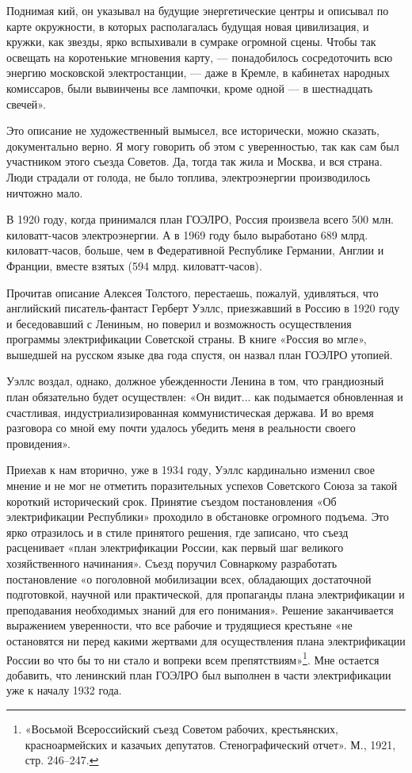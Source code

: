 \documentclass[12pt, a4paper, openany]{book}
\begin{document}
Поднимая кий, он указывал на будущие энергетические центры и описывал по карте окружности, в которых располагалась будущая новая цивилизация, и кружки, как звезды, ярко вспыхивали в сумраке огромной сцены. Чтобы так освещать на коротенькие мгновения карту, — понадобилось сосредоточить всю энергию московской электростанции, — даже в Кремле, в кабинетах народных комиссаров, были вывинчены все лампочки, кроме одной — в шестнадцать свечей».

Это описание не художественный вымысел, все исторически, можно сказать, документально верно. Я могу говорить об этом с уверенностью, так как сам был участником этого съезда Советов. Да, тогда так жила и Москва, и вся страна. Люди страдали от голода, не было топлива, электроэнергии производилось ничтожно мало.

В 1920 году, когда принимался план ГОЭЛРО, Россия произвела всего 500 млн. киловатт-часов электроэнергии. А в 1969 году было выработано 689 млрд. киловатт-часов, больше, чем в Федеративной Республике Германии, Англии и Франции, вместе взятых (594 млрд. киловатт-часов).

Прочитав описание Алексея Толстого, перестаешь, пожалуй, удивляться, что английский писатель-фантаст Герберт Уэллс, приезжавший в Россию в 1920 году и беседовавший с Лениным, но поверил и возможность осуществления программы электрификации Советской страны. В книге «Россия во мгле», вышедшей на русском языке два года спустя, он назвал план ГОЭЛРО утопией.

Уэллс воздал, однако, должное убежденности Ленина в том, что грандиозный план обязательно будет осуществлен: «Он видит... как подымается обновленная и счастливая, индустриализированная коммунистическая держава. И во время разговора со мной ему почти удалось убедить меня в реальности своего провидения».

Приехав к нам вторично, уже в 1934 году, Уэллс кардинально изменил свое мнение и не мог не отметить поразительных успехов Советского Союза за такой короткий исторический срок. Принятие съездом постановления «Об электрификации Республики» проходило в обстановке огромного подъема. Это ярко отразилось и в стиле принятого решения, где записано, что съезд расценивает «план электрификации России, как первый шаг великого хозяйственного начинания». Съезд поручил Совнаркому разработать постановление «о поголовной мобилизации всех, обладающих достаточной подготовкой, научной или практической, для пропаганды плана электрификации и преподавания необходимых знаний для его понимания». Решение заканчивается выражением уверенности, что все рабочие и трудящиеся крестьяне «не остановятся ни перед какими жертвами для осуществления плана электрификации России во что бы то ни стало и вопреки всем препятствиям»\footnote{«Восьмой Всероссийский съезд Советом рабочих, крестьянских, красноармейских и казачьих депутатов. Стенографический отчет». М., 1921, стр. 246–247.}. Мне остается добавить, что ленинский план ГОЭЛРО был выполнен в части электрификации уже к началу 1932 года.
\end{document}
